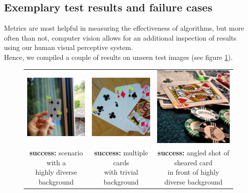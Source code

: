\documentclass[a4paper]{article}
\begin{document}
\subsection*{Exemplary test results and failure cases}
Metrics are most helpful in measuring the effectiveness of algorithms, but more often than not, computer vision allows for an additional inspection of results using our human visual perceptive system. \\Hence, we compiled a couple of results on unseen test images (see figure \ref{fig:testcases}).
\begin{figure}[h]
\label{fig:testcases}
\begin{tabular}{ccc}

 \includegraphics[width=44mm]{success3} &   \includegraphics[width=44mm]{success2} &   \includegraphics[width=44mm]{success1}\\
\makecell{\textbf{success:} scenario with a \\ highly diverse background}  & \makecell{\textbf{success:}  multiple cards \\ with trivial background} & \makecell{\textbf{success:}  angled shot of sheared card \\ in front of highly diverse background}\\[6pt]

\end{tabular}
\end{figure}
\end{document}
